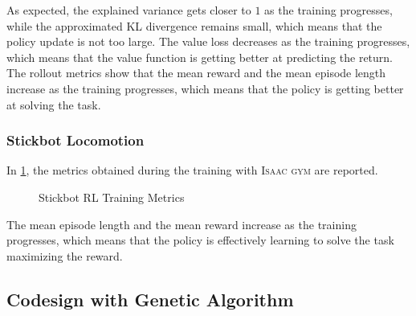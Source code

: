 As expected, the explained variance gets closer to $1$ as the training progresses, while the approximated KL divergence remains small, which means that the policy update is not too large. The value loss decreases as the training progresses, which means that the value function is getting better at predicting the return. The rollout metrics show that the mean reward and the mean episode length increase as the training progresses, which means that the policy is getting better at solving the task.

\subsubsection{Stickbot Locomotion}

In \cref{fig:stickbotresults}, the metrics obtained during the training with \textsc{Isaac gym} are reported.

\begin{figure}[h]
    \centering
    \caption{Stickbot RL Training Metrics}
    \label{fig:stickbotresults}
\end{figure}

The mean episode length and the mean reward increase as the training progresses, which means that the policy is effectively learning to solve the task maximizing the reward.

\subsection{Codesign with Genetic Algorithm}

